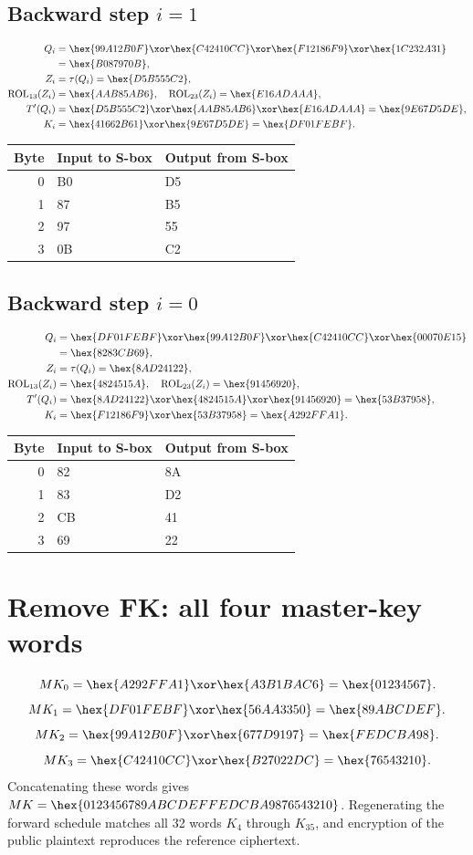 \subsection*{Backward step $i=1$}
\begin{align*}
Q_i&=\hex{99A12B0F}\xor\hex{C42410CC}\xor\hex{F12186F9}\xor\hex{1C232A31}\\&=\hex{B087970B},\\
Z_i&=\tau(Q_i)=\hex{D5B555C2},\\
\operatorname{ROL}_{13}(Z_i)&=\hex{AAB85AB6},\quad\operatorname{ROL}_{23}(Z_i)=\hex{E16ADAAA},\\
T'(Q_i)&=\hex{D5B555C2}\xor\hex{AAB85AB6}\xor\hex{E16ADAAA}=\hex{9E67D5DE},\\
K_i&=\hex{41662B61}\xor\hex{9E67D5DE}=\hex{DF01FEBF}.\end{align*}
\begingroup\small
\begin{longtable}{rll}
\toprule
Byte & Input to S-box & Output from S-box\\\midrule
\endhead
0 & B0 & D5\\
1 & 87 & B5\\
2 & 97 & 55\\
3 & 0B & C2\\
\bottomrule\end{longtable}
\endgroup
\subsection*{Backward step $i=0$}
\begin{align*}
Q_i&=\hex{DF01FEBF}\xor\hex{99A12B0F}\xor\hex{C42410CC}\xor\hex{00070E15}\\&=\hex{8283CB69},\\
Z_i&=\tau(Q_i)=\hex{8AD24122},\\
\operatorname{ROL}_{13}(Z_i)&=\hex{4824515A},\quad\operatorname{ROL}_{23}(Z_i)=\hex{91456920},\\
T'(Q_i)&=\hex{8AD24122}\xor\hex{4824515A}\xor\hex{91456920}=\hex{53B37958},\\
K_i&=\hex{F12186F9}\xor\hex{53B37958}=\hex{A292FFA1}.\end{align*}
\begingroup\small
\begin{longtable}{rll}
\toprule
Byte & Input to S-box & Output from S-box\\\midrule
\endhead
0 & 82 & 8A\\
1 & 83 & D2\\
2 & CB & 41\\
3 & 69 & 22\\
\bottomrule\end{longtable}
\endgroup
\section{Remove FK: all four master-key words}
\[MK_{0}=\hex{A292FFA1}\xor\hex{A3B1BAC6}=\hex{01234567}.\]
\[MK_{1}=\hex{DF01FEBF}\xor\hex{56AA3350}=\hex{89ABCDEF}.\]
\[MK_{2}=\hex{99A12B0F}\xor\hex{677D9197}=\hex{FEDCBA98}.\]
\[MK_{3}=\hex{C42410CC}\xor\hex{B27022DC}=\hex{76543210}.\]
Concatenating these words gives $MK=\hex{0123456789ABCDEFFEDCBA9876543210}$. Regenerating the forward schedule matches all 32 words $K_4$ through $K_{35}$, and encryption of the public plaintext reproduces the reference ciphertext.
